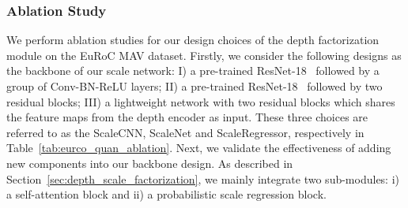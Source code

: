 \subsubsection{Ablation Study}
\label{sec:euroc_ablation}
We perform ablation studies for our design choices of the depth factorization module on the EuRoC MAV dataset. Firstly, we consider the following designs as the backbone of our scale network: I) a pre-trained ResNet-18~\cite{He_2016_CVPR} followed by a group of Conv-BN-ReLU layers; II) a pre-trained ResNet-18~\cite{He_2016_CVPR} followed by two residual blocks; III) a lightweight network with two residual blocks which shares the feature maps from the depth encoder as input. These three choices are referred to as the ScaleCNN, ScaleNet and ScaleRegressor, respectively in Table~\ref{tab:eurco_quan_ablation}. Next, we validate the effectiveness of adding new components into our backbone design. As described in Section~\ref{sec:depth_scale_factorization}, we mainly integrate two sub-modules: i) a self-attention block and ii) a probabilistic scale regression block.

\begin{table}[!t]
    \caption{Ablation results of design choices and the effectiveness of components in the depth factorization module of our model (\textbf{MonoIndoor})  on EuRoC~\cite{schonberger2016structure}. Porb. Reg.: the probabilistic scale regression block. Note: here we also use the residual pose estimation module when experimenting with different network designs for the depth factorization module.}
    \label{tab:eurco_quan_ablation}
    \centering
\end{table}

